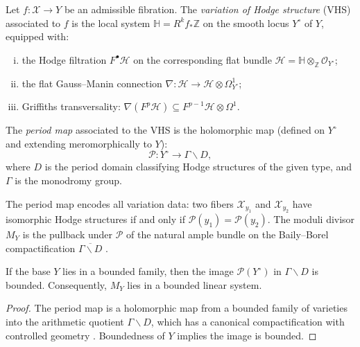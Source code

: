 \documentclass[11pt,openany]{book}
\begin{document}
\begin{definition}
Let $f : \mathcal{X} \to Y$ be an admissible fibration.
The \emph{variation of Hodge structure} (VHS) associated
to $f$ is the local system $\mathbb{H} = R^k f_*
\mathbb{Z}$ on the smooth locus $Y^\circ$ of $Y$,
equipped with:
\begin{enumerate}[(i)]
  \item the Hodge filtration $F^\bullet \mathcal{H}$ on
    the corresponding flat bundle $\mathcal{H} =
    \mathbb{H} \otimes_{\mathbb{Z}} \mathcal{O}_{Y^\circ}$;
  \item the flat Gauss--Manin connection $\nabla :
    \mathcal{H} \to \mathcal{H} \otimes \Omega^1_{Y^\circ}$;
  \item Griffiths transversality: $\nabla(F^p\mathcal{H})
    \subseteq F^{p-1}\mathcal{H} \otimes \Omega^1$.
\end{enumerate}
\end{definition}

\begin{definition}
The \emph{period map} associated to the VHS is the
holomorphic map (defined on $Y^\circ$ and extending
meromorphically to $Y$):
\[
  \mathcal{P} : Y^\circ \to \Gamma \backslash D,
\]
where $D$ is the period domain classifying Hodge structures
of the given type, and $\Gamma$ is the monodromy group.
\end{definition}

The period map encodes all variation data: two fibers
$\mathcal{X}_{y_1}$ and $\mathcal{X}_{y_2}$ have
isomorphic Hodge structures if and only if $\mathcal{P}(y_1)
= \mathcal{P}(y_2)$.  The moduli divisor $M_Y$ is the
pullback under $\mathcal{P}$ of the natural ample bundle
on the Baily--Borel compactification $\overline{\Gamma
\backslash D}$ \citep{deligne1971, griffiths1968}.

\begin{proposition}
\label{prop:period-map-bounded}
If the base $Y$ lies in a bounded family, then the image
$\mathcal{P}(Y^\circ)$ in $\Gamma \backslash D$ is bounded.
Consequently, $M_Y$ lies in a bounded linear system.
\end{proposition}

\begin{proof}
The period map is a holomorphic map from a bounded family
of varieties into the arithmetic quotient $\Gamma \backslash
D$, which has a canonical compactification with controlled
geometry \citep{griffiths1968,schmid1973}.  Boundedness
of $Y$ implies the image is bounded.
\end{proof}
\end{document}

